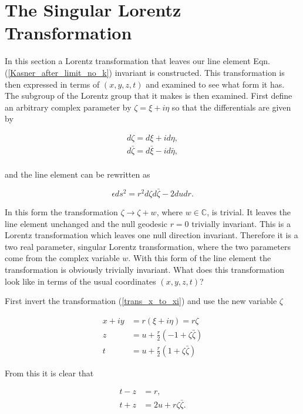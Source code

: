 \section{The Singular Lorentz Transformation}

In this section a Lorentz transformation that leaves our line element Eqn.(\ref{Kasner_after_limit_no_k}) invariant is constructed. This transformation is then expressed in terms of $(x,y,z,t)$ and examined to see what form it has. The subgroup of the Lorentz group that it makes is then examined. First define an arbitrary complex parameter by $\zeta = \xi + i \eta$ so that the differentials are given by \cite{Hogan}

\begin{eqnarray*}
d\zeta = {d\xi} + i {d\eta}, \\
d\bar{\zeta} = {d\bar{\xi}} - i {d\bar{\eta}}, \\
\end{eqnarray*}

\noindent and the line element can be rewritten as

\begin{equation*}
\epsilon {ds^2} = r^2 {d\zeta}{d\bar{\zeta}} - 2 {du}{dr}.
\end{equation*}

\noindent In this form the transformation $\zeta \rightarrow \zeta + w$, where $w \in \mathbb{C}$, is trivial. It leaves the line element unchanged and the null geodesic $r = 0$ trivially invariant. This is a Lorentz transformation which leaves one null direction invariant. Therefore it is a two real parameter, singular Lorentz transformation, where the two parameters come from the complex variable $w$. With this form of the line element the transformation is obviously trivially invariant. What does this transformation look like in terms of the usual coordinates $(x,y,z,t)$?

First invert the transformation (\ref{trans_x_to_xi}) and use the new variable $\zeta$

\begin{align} \nonumber
x + iy  & = r (\xi + i \eta) = r \zeta \\\nonumber
z  & = u + \frac{r}{2}(-1 + \zeta \bar{\zeta}) \\\label{Singular_Trans_x,y,z,t_xi,eta,r,u_first}
t &  = u + \frac{r}{2}(1 + \zeta \bar{\zeta})
\end{align}

\noindent From this it is clear that

\begin{align*}
t - z & = r, \\
t + z & = 2 u + r \zeta \bar{\zeta}. 
\end{align*}

